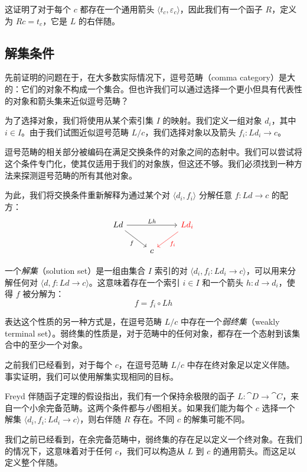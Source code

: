 \documentclass[DaoFP]{subfiles}
\begin{document}
这证明了对于每个 $c$ 都存在一个通用箭头 $\langle t_c, \varepsilon_c \rangle$，因此我们有一个函子 $R$，定义为 $R c = t_c$，它是 $L$ 的右伴随。

\subsection{解集条件}

先前证明的问题在于，在大多数实际情况下，逗号范畴（comma category）是大的：它们的对象不构成一个集合。但也许我们可以通过选择一个更小但具有代表性的对象和箭头集来近似逗号范畴？

为了选择对象，我们将使用从某个索引集 $I$ 的映射。我们定义一组对象 $d_i$，其中 $i \in I$。由于我们试图近似逗号范畴 $L/c$，我们选择对象以及箭头 $f_i \colon L d_i \to c$。

逗号范畴的相关部分被编码在满足交换条件的对象之间的态射中。我们可以尝试将这个条件专门化，使其仅适用于我们的对象族，但这还不够。我们必须找到一种方法来探测逗号范畴的所有其他对象。

为此，我们将交换条件重新解释为通过某个对 $\langle d_i, f_i \rangle$ 分解任意 $f \colon L d \to c$ 的配方：
\[
 \begin{tikzcd}
 L d
 \arrow[rd, "f"']
 \arrow[rr, "L h"]
 && \textcolor{red}{L d_i}
 \arrow[ld, red, "f_i"]
 \\
 &c
  \end{tikzcd}
\]

一个\emph{解集}（solution set）是一组由集合 $I$ 索引的对 $\langle d_i, f_i \colon L d_i \to c \rangle$，可以用来分解任何对 $\langle d, f \colon L d \to c \rangle$。这意味着存在一个索引 $i \in I$ 和一个箭头 $h \colon d \to d_i$，使得 $f$ 被分解为：
\[ f = f_i \circ L h \]

表达这个性质的另一种方式是，在逗号范畴 $L/c$ 中存在一个\emph{弱终集}（weakly terminal set）。弱终集的性质是，对于范畴中的任何对象，都存在一个态射到该集合中的至少一个对象。

之前我们已经看到，对于每个 $c$，在逗号范畴 $L/c$ 中存在终对象足以定义伴随。事实证明，我们可以使用解集实现相同的目标。

Freyd 伴随函子定理的假设指出，我们有一个保持余极限的函子 $L \colon \cat D \to \cat C$，来自一个小余完备范畴。这两个条件都与\emph{小}图相关。如果我们能为每个 $c$ 选择一个解集 $\langle d_i, f_i \colon L d_i \to c \rangle$，则右伴随 $R$ 存在。不同 $c$ 的解集可能不同。

我们之前已经看到，在余完备范畴中，弱终集的存在足以定义一个终对象。在我们的情况下，这意味着对于任何 $c$，我们可以构造从 $L$ 到 $c$ 的通用箭头。而这足以定义整个伴随。
\end{document}

